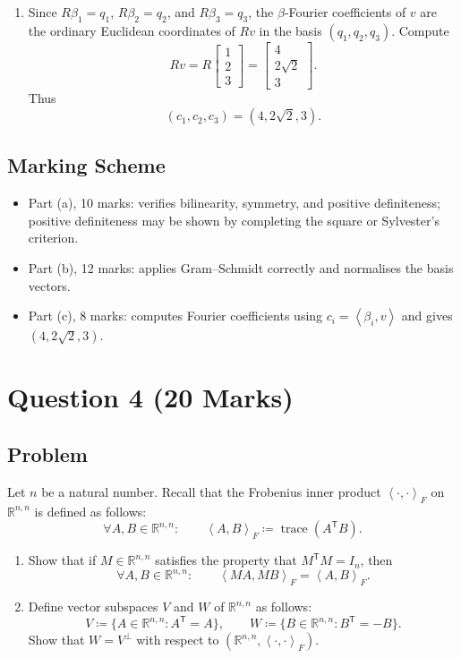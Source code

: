 \documentclass[12pt]{article}
\newcommand{\R}{\mathbb{R}}
\newcommand{\df}{\coloneqq}
\newcommand{\tr}{\operatorname{trace}}
\newcommand{\ip}[2]{\left\langle #1,#2\right\rangle}
\newcommand{\ipF}[2]{\left\langle #1,#2\right\rangle_F}
\newcommand{\T}{\mathsf{T}}
\begin{document}
\begin{enumerate}[label=(\alph*)]
  \item Since $R\beta_1=q_1$, $R\beta_2=q_2$, and $R\beta_3=q_3$, the $\beta$-Fourier coefficients of $v$ are the ordinary Euclidean coordinates of $Rv$ in the basis $(q_1,q_2,q_3)$. Compute
  \[
    Rv=R\begin{bmatrix}1\\2\\3\end{bmatrix}
    =
    \begin{bmatrix}4\\2\sqrt2\\3\end{bmatrix}.
  \]
  Thus
  \[
    \boxed{(c_1,c_2,c_3)=(4,2\sqrt2,3).}
  \]
\end{enumerate}

\newpage
\subsection{Marking Scheme}
\begin{itemize}[leftmargin=*]
  \item Part (a), 10 marks: verifies bilinearity, symmetry, and positive definiteness; positive definiteness may be shown by completing the square or Sylvester's criterion.
  \item Part (b), 12 marks: applies Gram--Schmidt correctly and normalises the basis vectors.
  \item Part (c), 8 marks: computes Fourier coefficients using $c_i=\ip{\beta_i}{v}$ and gives $(4,2\sqrt2,3)$.
\end{itemize}

\newpage
\section{Question 4 \hfill (20 Marks)}

\subsection{Problem}
Let $n$ be a natural number. Recall that the Frobenius inner product $\ipF{\cdot}{\cdot}$ on $\R^{n,n}$ is defined as follows:
\[
  \forall A,B\in\R^{n,n}:\qquad
  \ipF{A}{B}\df \tr(A^\T B).
\]
\begin{enumerate}[label=(\alph*)]
  \item Show that if $M\in\R^{n,n}$ satisfies the property that $M^\T M=I_n$, then
  \[
    \forall A,B\in\R^{n,n}:\qquad
    \ipF{MA}{MB}=\ipF{A}{B}.
  \]
  \item Define vector subspaces $V$ and $W$ of $\R^{n,n}$ as follows:
  \[
    V\df\{A\in\R^{n,n}:A^\T=A\},
    \qquad
    W\df\{B\in\R^{n,n}:B^\T=-B\}.
  \]
  Show that $W=V^\perp$ with respect to $(\R^{n,n},\ipF{\cdot}{\cdot})$.
\end{enumerate}
\end{document}
